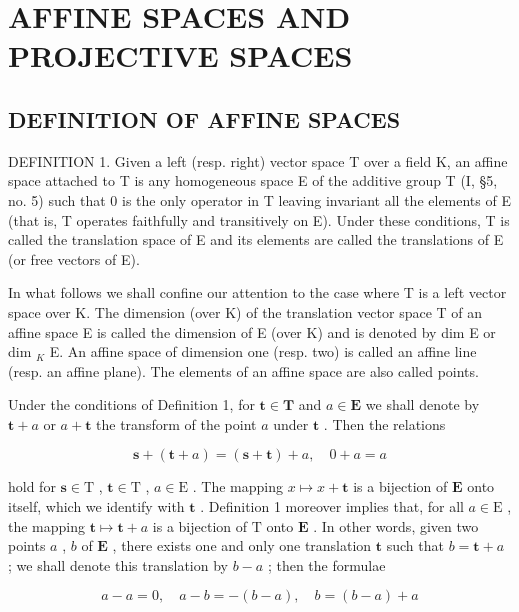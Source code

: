 \section{AFFINE SPACES AND PROJECTIVE SPACES}

\subsection{DEFINITION OF AFFINE SPACES}

DEFINITION 1. Given a left (resp. right) vector space T over a field K, an affine space attached to T is any homogeneous space E of the additive group T (I, §5, no. 5) such that 0 is the only operator in T leaving invariant all the elements of E (that is, T operates faithfully and transitively on E). Under these conditions, T is called the translation space of E and its elements are called the translations of E (or free vectors of E).

In what follows we shall confine our attention to the case where T is a left vector space over K. The dimension (over K) of the translation vector space T of an affine space E is called the dimension of E (over K) and is denoted by dim E or dim \(_{K}\) E. An affine space of dimension one (resp. two) is called an affine line (resp. an affine plane). The elements of an affine space are also called points.

Under the conditions of Definition 1, for \(\mathbf{t} \in \mathbf{T}\) and \(a \in \mathbf{E}\) we shall denote by \(\mathbf{t} + a\) or \(a + \mathbf{t}\) the transform of the point \(a\) under \(\mathbf{t}\) . Then the relations

\[
\mathbf {s} + (\mathbf {t} + a) = (\mathbf {s} + \mathbf {t}) + a, \quad 0 + a = a\tag{1}
\]

hold for \(\mathbf{s} \in \mathrm{T}\) , \(\mathbf{t} \in \mathrm{T}\) , \(a \in \mathrm{E}\) . The mapping \(x \mapsto x + \mathbf{t}\) is a bijection of \(\mathbf{E}\) onto itself, which we identify with \(\mathbf{t}\) . Definition 1 moreover implies that, for all \(a \in \mathrm{E}\) , the mapping \(\mathbf{t} \mapsto \mathbf{t} + a\) is a bijection of \(\mathrm{T}\) onto \(\mathbf{E}\) . In other words, given two points \(a\) , \(b\) of \(\mathbf{E}\) , there exists one and only one translation \(\mathbf{t}\) such that \(b = \mathbf{t} + a\) ; we shall denote this translation by \(b - a\) ; then the formulae

\[
a - a = 0, \quad a - b = - (b - a), \quad b = (b - a) + a\tag{2}
\]


